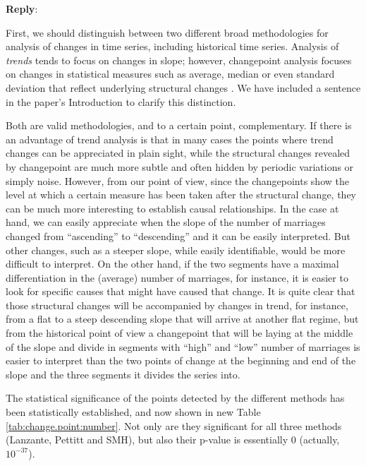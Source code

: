 \documentclass[11pt]{article}
\newcounter{reviewer}
\newcounter{point}[reviewer]
\newenvironment{reply}
   {\medskip \noindent \begin{sf}\textbf{Reply}:\  }
   {\medskip \end{sf}}
\begin{document}
\begin{reply}

First, we should distinguish between two different broad methodologies for
analysis of changes in time series, including historical time series. Analysis
of {\em trends} tends to focus on changes in slope; however, changepoint
analysis focuses on changes in statistical measures such as average, median or
even standard deviation that reflect underlying structural changes
\cite{sharma2016trend}. We have included a sentence in the paper's
  Introduction to clarify this distinction.

Both are valid methodologies, and to a certain point, complementary. If there is
an advantage of trend analysis is that in many cases the points where trend
changes can be appreciated in plain sight, while the structural changes revealed
by changepoint are much more subtle and often hidden by periodic variations or
simply noise. However, from our point of view, since the changepoints show the
level at which a certain measure has been taken after the structural change,
they can be much more interesting to establish causal relationships. In the case
at hand, we can easily appreciate when the slope of the number of marriages
changed from ``ascending'' to ``descending'' and it can be easily
interpreted. But other changes, such as a steeper slope, while easily
identifiable, would be more difficult to interpret. On the other hand, if the
two segments have a maximal differentiation in the (average) number of marriages, for
instance, it is easier to look for specific causes that might have caused that
change.  It is quite clear that those structural changes will be accompanied by
changes in trend, for instance, from a flat to a steep descending slope that
will arrive at another flat regime, but from the historical point of view a
changepoint that will be laying at the middle of the slope and divide in
segments with ``high'' and ``low'' number of marriages is easier to interpret
than the two points of change at the beginning and end of the slope and the
three segments it divides the series into.

The statistical significance of the points detected by the different methods has
been statistically established, and now shown in new Table \ref{tab:change.point:number}. Not only are they
significant for all three methods (Lanzante, Pettitt and SMH), but also their
p-value is essentially 0 (actually, $10^{-37}$).


\end{reply}
\end{document}
